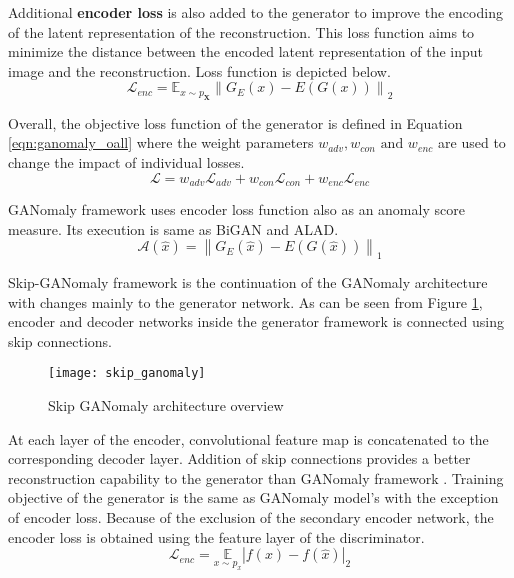 Additional \textbf{encoder loss} is also added to the generator to improve the encoding of the latent
representation of the reconstruction. This loss function aims to minimize the distance between the
encoded latent representation of the input image and the reconstruction. Loss function is
depicted below.
\begin{equation}
    \mathcal{L}_{e n c}=\mathbb{E}_{x \sim p_{\mathbf{X}}}\left\|G_{E}(x)-E(G(x))\right\|_{2} 
\end{equation}

Overall, the objective loss function of the generator is defined in Equation
\ref{eqn:ganomaly_oall} where the weight parameters $w_{adv}, w_{con} \text { and } w_{enc}$
are used to change the impact of individual losses.
\begin{equation}
    \label{eqn:ganomaly_oall}
    \mathcal{L}=w_{a d v} \mathcal{L}_{a d v}+w_{c o n} \mathcal{L}_{c o n}+w_{e n c} \mathcal{L}_{e n c} 
\end{equation}

GANomaly framework uses encoder loss function also as an anomaly score measure. Its execution is same 
as BiGAN and ALAD. 
\begin{equation}
\label{eqn:ganomaly_as}
    \mathcal{A}(\hat{x})=\left\|G_{E}(\hat{x})-E(G(\hat{x}))\right\|_{1}  
\end{equation}

Skip-GANomaly framework\cite{Akay2019SkipGANomalySC} is the continuation of the GANomaly architecture with changes mainly to the
generator network. As can be seen from Figure \ref{fig:sganomaly_model}, encoder and decoder
networks inside the generator framework is connected using skip connections. 
\begin{figure}[h!]
	\centering
	\texttt{[image: skip\_ganomaly]}
    \caption{Skip GANomaly architecture overview \cite{Akay2019SkipGANomalySC}}
    \label{fig:sganomaly_model}
\end{figure}

At each layer of the encoder, convolutional feature map is concatenated to the corresponding decoder
layer. Addition of skip connections provides a better reconstruction capability to the generator
than GANomaly framework \cite{Akay2018GANomalySA}. Training objective of the generator is the same as 
GANomaly model's with the exception of encoder loss. Because of the exclusion of the secondary 
encoder network, the encoder loss is obtained using the feature layer of the discriminator. 
\begin{equation}
    \mathcal{L}_{enc}=\underset{x \sim p_{x}}{\mathbb{E}}|f(x)-f(\hat{x})|_{2}  
\end{equation}

